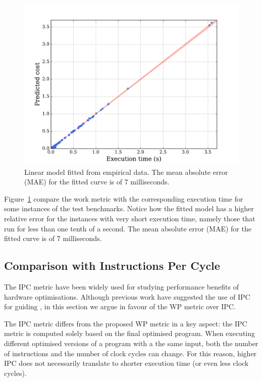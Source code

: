 \begin{figure}[htb]
    \centering
    \includegraphics[width=0.9\linewidth]{figs/cost-model.pdf}
    \caption{Linear model fitted from empirical data. The mean absolute error (MAE) for the fitted curve is of 7 milliseconds.}
    \label{fig:cost-model}
\end{figure}

Figure~\ref{fig:cost-model} compare the work metric with the corresponding execution time for some instances of the test benchmarks.
Notice how the fitted model has a higher relative error for the instances with very short execution time, namely those that run for less than one tenth of a second.
The mean absolute error (MAE) for the fitted curve is of 7 milliseconds.

\subsection{Comparison with Instructions Per Cycle} \label{sec:ipc-vs-work-metric}

The IPC metric have been widely used for studying performance benefits of hardware optimisations.
Although previous work have suggested the use of IPC for guiding {\itercomp}, in this section we argue in favour of the WP metric over IPC.

The IPC metric differs from the proposed WP metric in a key aspect:
the IPC metric is computed solely based on the final optimised program.
When executing different optimised versions of a program with a the same input, both the number of instructions and the number of clock cycles can change.
For this reason, higher IPC does not necessarily translate to shorter execution time (or even less clock cycles).

